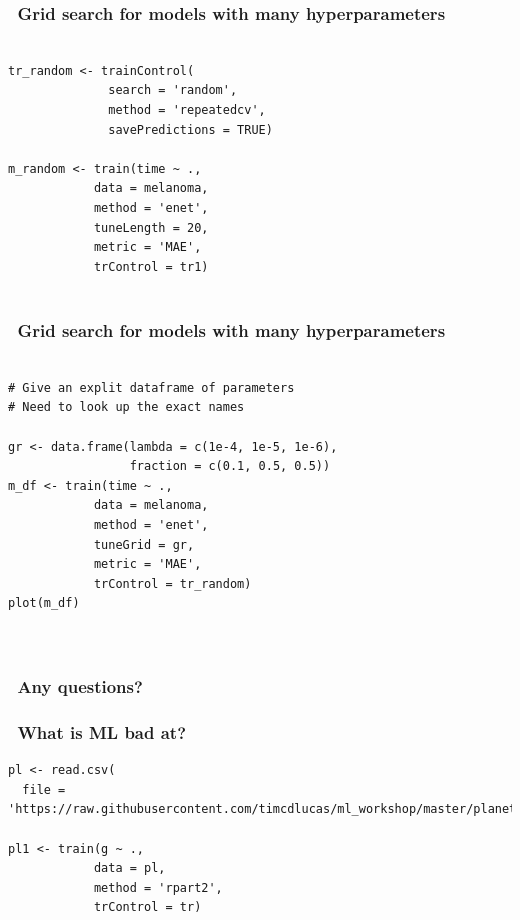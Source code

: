 \documentclass[handout, aspectratio = 169]{beamer}
\begin{document}
\begin{frame}[fragile]
\frametitle{\insertframenumber~Grid search for models with many hyperparameters}
\begin{Verbatim}

tr_random <- trainControl(
              search = 'random',
              method = 'repeatedcv',
              savePredictions = TRUE)

m_random <- train(time ~ ., 
            data = melanoma,
            method = 'enet',
            tuneLength = 20,
            metric = 'MAE',
            trControl = tr1)
            
\end{Verbatim}

\end{frame} 




\begin{frame}[fragile]
\frametitle{\insertframenumber~Grid search for models with many hyperparameters}
\begin{Verbatim}

# Give an explit dataframe of parameters
# Need to look up the exact names 

gr <- data.frame(lambda = c(1e-4, 1e-5, 1e-6),
                 fraction = c(0.1, 0.5, 0.5))
m_df <- train(time ~ ., 
            data = melanoma,
            method = 'enet',
            tuneGrid = gr,
            metric = 'MAE',
            trControl = tr_random)
plot(m_df)

            
\end{Verbatim}

\end{frame} 



\begin{frame}
\frametitle{\insertframenumber~Any questions?}


\end{frame} 










\begin{frame}[fragile]
\frametitle{\insertframenumber~What is ML bad at?}
\renewcommand{\FancyVerbFormatLine}[1]{%
   \ifnum\value{FancyVerbLine}=1\color{cyan}#1%
   \else #1\fi}
\begin{Verbatim}
pl <- read.csv(
  file = 'https://raw.githubusercontent.com/timcdlucas/ml_workshop/master/planets.csv')

pl1 <- train(g ~ ., 
            data = pl,
            method = 'rpart2',
            trControl = tr)


\end{Verbatim}

\end{frame} 
\end{document}
